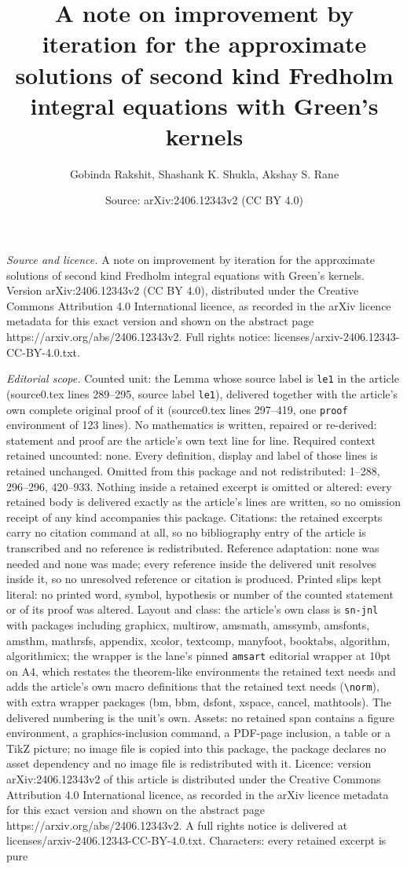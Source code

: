 \documentclass[10pt,a4paper]{amsart}
\title[A note on improvement by iteration for the approximate solut]{A note on improvement by iteration for the approximate solutions of second kind Fredholm integral equations with Green's kernels}
\author{Gobinda Rakshit, Shashank K. Shukla, Akshay S. Rane}
\date{Source: arXiv:2406.12343v2 (CC BY 4.0)}
\begin{document}
\maketitle

\noindent\emph{Source and licence.} A note on improvement by iteration for the approximate solutions of second kind Fredholm integral equations with Green's kernels. Version arXiv:2406.12343v2 (CC BY 4.0), distributed under the Creative Commons Attribution 4.0 International licence, as recorded in the arXiv licence metadata for this exact version and shown on the abstract page https://arxiv.org/abs/2406.12343v2. Full rights notice: licenses/arxiv-2406.12343-CC-BY-4.0.txt.\par\smallskip

\noindent\textit{Editorial scope.} Counted unit: the Lemma whose source label is \texttt{le1} in the article (source0.tex lines 289--295, source label \texttt{le1}), delivered together with the article's own complete original proof of it (source0.tex lines 297--419, one \texttt{proof} environment of 123 lines). No mathematics is written, repaired or re-derived: statement and proof are the article's own text line for line. Required context retained uncounted: none. Every definition, display and label of those lines is retained unchanged. Omitted from this package and not redistributed: 1--288, 296--296, 420--933. Nothing inside a retained excerpt is omitted or altered: every retained body is delivered exactly as the article's lines are written, so no omission receipt of any kind accompanies this package. Citations: the retained excerpts carry no citation command at all, so no bibliography entry of the article is transcribed and no reference is redistributed. Reference adaptation: none was needed and none was made; every reference inside the delivered unit resolves inside it, so no unresolved reference or citation is produced. Printed slips kept literal: no printed word, symbol, hypothesis or number of the counted statement or of its proof was altered. Layout and class: the article's own class is \texttt{sn-jnl} with packages including graphicx, multirow, amsmath, amssymb, amsfonts, amsthm, mathrsfs, appendix, xcolor, textcomp, manyfoot, booktabs, algorithm, algorithmicx; the wrapper is the lane's pinned \texttt{amsart} editorial wrapper at 10pt on A4, which restates the theorem-like environments the retained text needs and adds the article's own macro definitions that the retained text needs (\texttt{\textbackslash norm}), with extra wrapper packages (bm, bbm, dsfont, xspace, cancel, mathtools). The delivered numbering is the unit's own. Assets: no retained span contains a figure environment, a graphics-inclusion command, a PDF-page inclusion, a table or a TikZ picture; no image file is copied into this package, the package declares no asset dependency and no image file is redistributed with it. Licence: version arXiv:2406.12343v2 of this article is distributed under the Creative Commons Attribution 4.0 International licence, as recorded in the arXiv licence metadata for this exact version and shown on the abstract page https://arxiv.org/abs/2406.12343v2. A full rights notice is delivered at licenses/arxiv-2406.12343-CC-BY-4.0.txt. Characters: every retained excerpt is pure 
\end{document}
